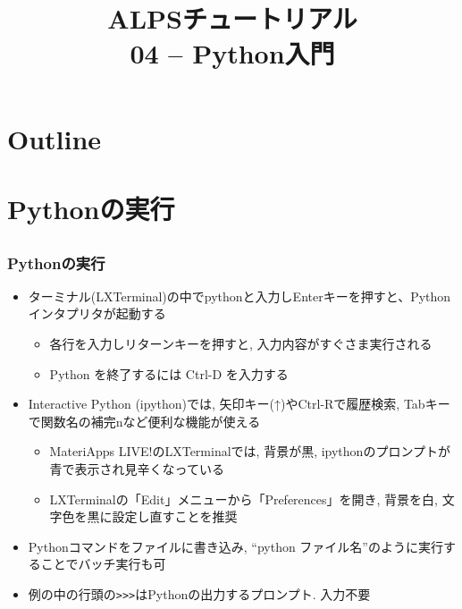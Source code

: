 
\title{ALPSチュートリアル \\ 04 -- Python入門}




\begin{frame}
  \titlepage
\end{frame}

\section*{Outline}
\begin{frame}
  \tableofcontents
\end{frame}

\section{Pythonの実行}

\subsection*{\redm\whiteb\greenb}
\begin{frame}[t, fragile]
\frametitle{Pythonの実行}
\begin{itemize}
\item ターミナル(LXTerminal)の中でpythonと入力しEnterキーを押すと、Pythonインタプリタが起動する
  \begin{itemize}
  \item 各行を入力しリターンキーを押すと, 入力内容がすぐさま実行される
  \item Python を終了するには Ctrl-D を入力する
  \end{itemize}
\item Interactive Python (ipython)では, 矢印キー(↑)やCtrl-Rで履歴検索, Tabキーで関数名の補完nなど便利な機能が使える
  \begin{itemize}
  \item MateriApps LIVE!のLXTerminalでは, 背景が黒, ipythonのプロンプトが青で表示され見辛くなっている
  \item LXTerminalの「Edit」メニューから「Preferences」を開き, 背景を白, 文字色を黒に設定し直すことを推奨
  \end{itemize}
\item Pythonコマンドをファイルに書き込み, ``python ファイル名''のように実行することでバッチ実行も可
\item 例の中の行頭の\verb+>>>+はPythonの出力するプロンプト. 入力不要
\end{itemize}
\end{frame}

